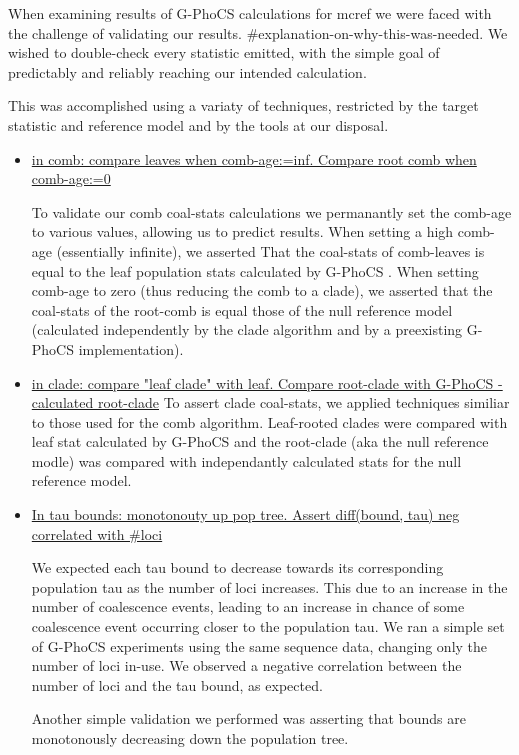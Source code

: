 \documentclass[11pt]{article}
\newcommand{\1}{\mathbbm{1}}
\newcommand{\gp}{G-PhoCS }
\begin{document}
When examining results of \gp calculations for mcref we were faced with the challenge of validating our results. \#explanation-on-why-this-was-needed. We wished to double-check every statistic emitted, with the simple goal of predictably and reliably reaching our intended calculation.

This was accomplished using a variaty of techniques, restricted by the target statistic and reference model and by the tools at our disposal. 


\begin{itemize}

\item \underline{in comb: compare leaves when comb-age:=inf. Compare root comb when comb-age:=0}

To validate our comb coal-stats calculations we permanantly set the comb-age to various values, allowing us to predict results. When setting a high comb-age (essentially infinite), we asserted That the coal-stats of comb-leaves is equal to the leaf population stats calculated by \gp. When setting comb-age to zero (thus reducing the comb to a clade), we asserted that the coal-stats of the root-comb is equal those of the null reference model (calculated independently by the clade algorithm and by a preexisting \gp implementation).



\item \underline{in clade: compare "leaf clade" with leaf. Compare root-clade with \gp -calculated root-clade}
To assert clade coal-stats, we applied techniques similiar to those used for the comb algorithm. Leaf-rooted clades were compared with leaf stat calculated by \gp and the root-clade (aka the null reference modle) was compared with independantly calculated stats for the null reference model. 

\item \underline{In tau bounds: monotonouty up pop tree. Assert diff(bound, tau) neg correlated with \#loci}

We expected each tau bound to decrease towards its corresponding population tau as the number of loci increases. This due to an increase in the number of coalescence events, leading to an increase in chance of some coalescence event occurring closer to the population tau. We ran a simple set of \gp experiments using the same sequence data, changing only the number of loci in-use. We observed a negative correlation between the number of loci and the tau bound, as expected.

Another simple validation we performed was asserting that bounds are monotonously decreasing down the population tree.

\end{itemize}
\end{document}
